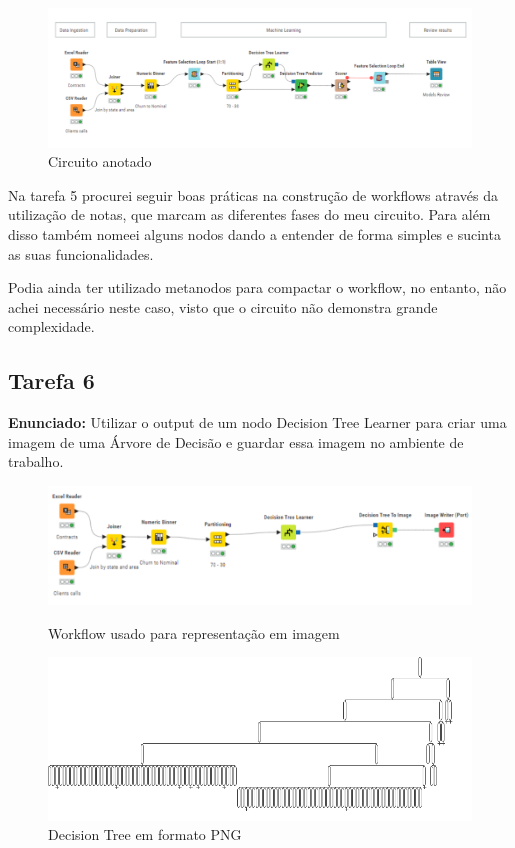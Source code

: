 \documentclass[a4paper, 12pt]{article}
\begin{document}
\begin{figure}[htp]
    \centering
    \includegraphics[scale=0.75]{T5/GoodHabits.png}
    \caption{Circuito anotado}
    \label{fig:enter-label}
\end{figure}

Na tarefa 5 procurei seguir boas práticas na construção de workflows através da utilização de notas, que marcam as diferentes fases do meu circuito. Para além disso também nomeei alguns nodos dando a entender de forma simples e sucinta as suas funcionalidades.  

Podia ainda ter utilizado metanodos para compactar o workflow, no entanto, não achei necessário neste caso, visto que o circuito não demonstra grande complexidade.

\newpage

\subsection{Tarefa 6}
\textbf{Enunciado:} Utilizar o output de um nodo Decision Tree Learner para criar uma imagem de uma Árvore de Decisão e guardar essa imagem no ambiente de trabalho.

\begin{figure}[htp]
    \centering
    \includegraphics[scale=0.8]{T6/Circuito.png}
    \caption{Workflow usado para representação em imagem}
    \label{fig:enter-label}
    \vspace{1cm}
    \centering
    \includegraphics[scale=0.7]{T6/decision_tree.png}
    \caption{Decision Tree em formato PNG}
    \label{fig:enter-label}
    
\end{figure}
\end{document}
